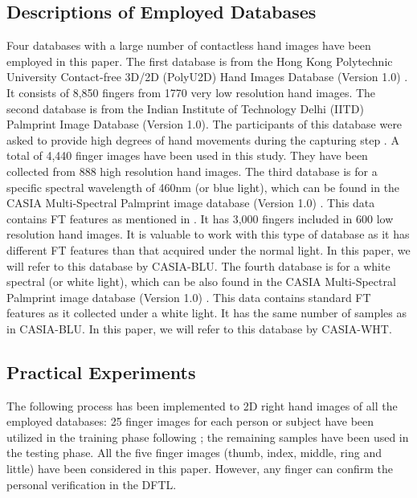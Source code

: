 \documentclass[conference]{IEEEtran}
\begin{document}
\subsection{Descriptions of Employed Databases}
Four databases with a large number of contactless hand images have been employed in this paper. The first database is from the Hong Kong Polytechnic University Contact-free 3D/2D (PolyU2D) Hand Images Database (Version 1.0) \cite{Databasever1PolyU3D2D}. It consists of 8,850 fingers from 1770 very low resolution hand images. The second database is from the Indian Institute of Technology Delhi (IITD) Palmprint Image Database (Version 1.0). The participants of this database were asked to provide high degrees of hand movements during the capturing step \cite{IIT-Delhi-PalmprintV1} \cite{kumar2008incorporating}. A total of 4,440 finger images have been used in this study. They have been collected from 888 high resolution hand images. The third database is for a specific spectral wavelength of 460nm (or blue light), which can be found in the CASIA Multi-Spectral Palmprint image database (Version 1.0) \cite{CASIAMS-PalmprintV1}. This data contains FT features as mentioned in \cite{Khan2011Contour}\cite{khan2014multispectral}. It has 3,000 fingers included in 600 low resolution hand images. It is valuable to work with this type of database as it has different FT features than that acquired under the normal light. In this paper, we will refer to this database by CASIA-BLU. The fourth database is for a white spectral (or white light), which can be also found in the CASIA Multi-Spectral Palmprint image database (Version 1.0) \cite{CASIAMS-PalmprintV1}. This data contains standard FT features as it collected under a white light. It has the same number of samples as in CASIA-BLU. In this paper, we will refer to this database by CASIA-WHT. 

\subsection{Practical Experiments}
The following process has been implemented to 2D right hand images of all the employed databases: 25 finger images for each person or subject have been utilized in the training phase following \cite{Al-Nima2017Robust} \cite{Al-Nima2017efficient} \cite{Al-Nima2017finger}; the remaining samples have been used in the testing phase. All the five finger images (thumb, index, middle, ring and little) have been considered in this paper. However, any finger can confirm the personal verification in the DFTL.
\end{document}
